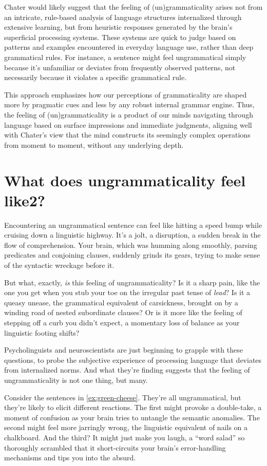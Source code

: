 Chater would likely suggest that the feeling of (un)grammaticality arises not from an intricate, rule-based analysis of language structures internalized through extensive learning, but from heuristic responses generated by the brain's superficial processing systems. These systems are quick to judge based on patterns and examples encountered in everyday language use, rather than deep grammatical rules. For instance, a sentence might feel ungrammatical simply because it's unfamiliar or deviates from frequently observed patterns, not necessarily because it violates a specific grammatical rule.

This approach emphasizes how our perceptions of grammaticality are shaped more by pragmatic cues and less by any robust internal grammar engine. Thus, the feeling of (un)grammaticality is a product of our minds navigating through language based on surface impressions and immediate judgments, aligning well with Chater's view that the mind constructs its seemingly complex operations from moment to moment, without any underlying depth.

\section{What does ungrammaticality feel like2?}

Encountering an ungrammatical sentence can feel like hitting a speed bump while cruising down a linguistic highway. It's a jolt, a disruption, a sudden break in the flow of comprehension. Your brain, which was humming along smoothly, parsing predicates and conjoining clauses, suddenly grinds its gears, trying to make sense of the syntactic wreckage before it.

But what, exactly, \textit{is} this feeling of ungrammaticality? Is it a sharp pain, like the one you get when you stub your toe on the irregular past tense of \textit{lead}? Is it a queasy unease, the grammatical equivalent of carsickness, brought on by a winding road of nested subordinate clauses? Or is it more like the feeling of stepping off a curb you didn't expect, a momentary loss of balance as your linguistic footing shifts?

Psycholinguists and neuroscientists are just beginning to grapple with these questions, to probe the subjective experience of processing language that deviates from internalized norms. And what they're finding suggests that the feeling of ungrammaticality is not one thing, but many.

Consider the sentences in \ref{ex:green-cheese}. They're all ungrammatical, but they're likely to elicit different reactions. The first might provoke a double-take, a moment of confusion as your brain tries to untangle the semantic anomalies. The second might feel more jarringly wrong, the linguistic equivalent of nails on a chalkboard. And the third? It might just make you laugh, a ``word salad'' so thoroughly scrambled that it short-circuits your brain's error-handling mechanisms and tips you into the absurd.


